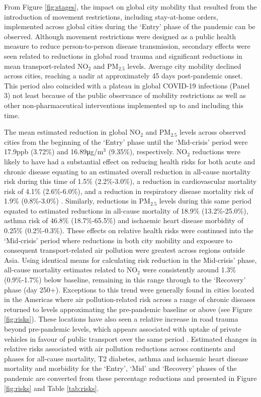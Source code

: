 \documentclass[preprint,10pt]{elsarticle} %
\begin{document}
From Figure \ref{fig:stages}, the impact on global city mobility that resulted from the introduction of movement restrictions, including stay-at-home orders, implemented across global cities during the `Entry' phase\cite{hale2021global} of the pandemic can be observed. Although movement restrictions were designed as a public health measure to reduce person-to-person disease transmission, secondary effects were seen related to reductions in global road trauma \cite{ITFRS2023} and significant reductions in mean transport-related NO$_{2}$ and PM$_{2.5}$ levels\cite{zhang2023impact}. Average city mobility declined across cities, reaching a nadir at approximately 45 days post-pandemic onset. This period also coincided with a plateau in global COVID-19 infections (Panel 3) not least because of the public observance of mobility restrictions as well as other non-pharmaceutical interventions implemented up to and including this time\cite{hale2021global}. 

The mean estimated reduction in global NO$_{2}$ and PM$_{2.5}$ levels across observed cities from the beginning of the `Entry' phase until the `Mid-crisis' period were 17.9ppb (3.72\%) and 16.89\si{\micro\gram}/m$^{3}$ (9.35\%), respectively. NO$_{2}$ reductions were likely to have had a substantial effect on reducing health risks for both acute and chronic disease equating to an estimated overall reduction in all-cause mortality risk during this time of 1.5\% (2.2\%-3.0\%), a reduction in cardiovascular mortality risk of 4.1\% (2.6\%-6.0\%), and a reduction in respiratory disease mortality risk of 1.9\% (0.8\%-3.0\%) \cite{Huang19Pollution}. Similarly, reductions in PM$_{2.5}$ levels during this same period equated to estimated reductions in all-cause mortality of 18.9\% (13.2\%-25.0\%)\cite{Yu2020PM2.5}, asthma risk of 46.8\% (18.7\%-65.5\%) and ischaemic heart disease morbidity of 0.25\% (0.2\%-0.3\%)\cite{Xie257}. These effects on relative health risks were continued into the `Mid-crisis' period where reductions in both city mobility and exposure to consequent transport-related air pollution were greatest across regions outside Asia. Using identical means for calculating risk reduction in the Mid-crisis' phase, all-cause mortality estimates related to NO$_{2}$ were consistently around 1.3$\%$ (0.9\%-1.7\%) below baseline, remaining in this range through to the `Recovery' phase (day 250+). Exceptions to this trend were generally found in cities located in the Americas where air pollution-related risk across a range of chronic diseases returned to levels approximating the pre-pandemic baseline or above (see Figure \ref{fig:risks}). These locations have also seen a relative increase in road trauma beyond pre-pandemic levels, which appears associated with uptake of private vehicles in favour of public transport over the same period \cite{ITFRS2023,saladie2023back,DAS20211}. Estimated changes in relative risks associated with air pollution reductions across continents and phases for all-cause mortality, T2 diabetes, asthma and ischaemic heart disease mortality and morbidity for the `Entry', `Mid' and `Recovery' phases of the pandemic are converted from these percentage reductions and presented in Figure \ref{fig:risks} and Table \ref{tab:risks}. 
\end{document}
